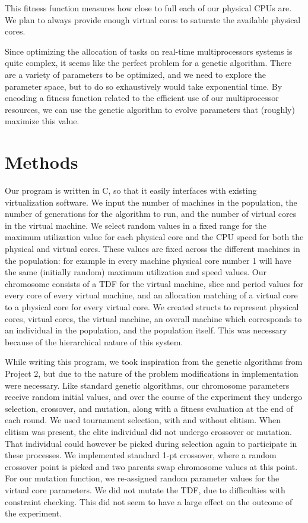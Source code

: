 \documentclass[11pt]{article}
\begin{document}
This fitness function measures how close to full each of our physical CPUs are. We plan to always provide enough virtual cores to saturate the available physical cores. 

Since optimizing the allocation of tasks on real-time multiprocessors systems is quite complex, it seems like the perfect problem for a genetic algorithm. There are a variety of parameters to be optimized, and we need to explore the parameter space, but to do so exhaustively would take exponential time. By encoding a fitness function related to the efficient use of our multiprocessor resources, we can use the genetic algorithm to evolve parameters that (roughly) maximize this value.

\section{Methods}

Our program is written in C, so that it easily interfaces with existing virtualization software. We input the number of machines in the population, the number of generations for the algorithm to run, and the number of virtual cores in the virtual machine. We select random values in a fixed range for the maximum utilization value for each physical core and the CPU speed for both the physical and virtual cores. These values are fixed across the different machines in the population: for example in every machine physical core number 1 will have the same (initially random) maximum utilization and speed values. Our chromosome consists of a TDF for the virtual machine, slice and period values for every core of every virtual machine, and an allocation matching of a virtual core to a physical core for every virtual core. We created structs to represent physical cores, virtual cores, the virtual machine, an overall machine which corresponds to an individual in the population, and the population itself. This was necessary because of the hierarchical nature of this system. 

While writing this program, we took inspiration from the genetic algorithms from Project 2, but due to the nature of the problem modifications in implementation were necessary. Like standard genetic algorithms, our chromosome parameters receive random initial values, and over the course of the experiment they undergo selection, crossover, and mutation, along with a fitness evaluation at the end of each round. We used tournament selection, with and without elitism. When elitism was present, the elite individual did not undergo crossover or mutation. That individual could however be picked during selection again to participate in these processes. We implemented standard 1-pt crossover, where a random crossover point is picked and two parents swap chromosome values at this point. For our mutation function, we re-assigned random parameter values for the virtual core parameters. We did not mutate the TDF, due to difficulties with constraint checking. This did not seem to have a large effect on the outcome of the experiment. 
\end{document}
